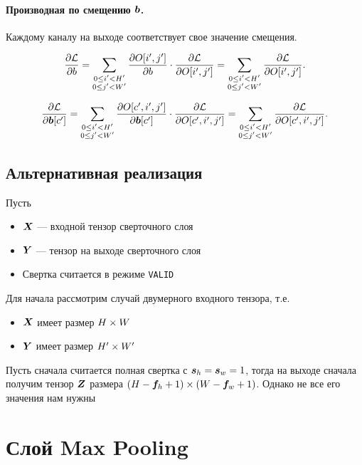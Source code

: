 \documentclass{report}
\numberwithin{theorem}{chapter}
\numberwithin{statement}{chapter}
\numberwithin{lemma}{chapter}
\theoremstyle{definition}
\numberwithin{task}{chapter}
\theoremstyle{remark}
\numberwithin{example}{chapter}
\theoremstyle{definition}
\numberwithin{definition}{chapter}
\theoremstyle{remark}
\theoremstyle{remark}
\numberwithin{lyrics}{section}
\begin{document}
\paragraph{Производная по смещению $\boldsymbol{b}$.}
Каждому каналу на выходе соответствует свое значение смещения.

\begin{equation}
\frac{\partial \mathcal{L} }{\partial b} = \sum\limits_{\substack{0 \le i' < H' \\ 0 \le j' < W'}} \frac{\partial O[i', j'] }{\partial b} \cdot \frac{\partial \mathcal{L} }{\partial O[i', j']} = \sum\limits_{\substack{0 \le i' < H' \\ 0 \le j' < W'}} \frac{\partial \mathcal{L} }{\partial O[i', j']}.
\end{equation}

\begin{equation}
\frac{\partial \mathcal{L} }{\partial \boldsymbol{b}[c']} = \sum\limits_{\substack{0 \le i' < H' \\ 0 \le j' < W'}} \frac{\partial O[c', i', j'] }{\partial \boldsymbol{b}[c']} \cdot \frac{\partial \mathcal{L} }{\partial O[c', i', j']} = \sum\limits_{\substack{0 \le i' < H' \\ 0 \le j' < W'}} \frac{\partial \mathcal{L} }{\partial O[c', i', j']}.
\end{equation}

\subsection{Альтернативная реализация}
Пусть 
\begin{itemize}
	\item $\boldsymbol{X}$ --- входной тензор сверточного слоя
	\item $\boldsymbol{Y}$ --- тензор на выходе сверточного слоя
	\item Свертка считается в режиме \texttt{VALID}
\end{itemize}

Для начала рассмотрим случай двумерного входного тензора, т.е.
\begin{itemize}
	\item $\boldsymbol{X}$ имеет размер $H \times W$
	\item $\boldsymbol{Y}$ имеет размер $H' \times W'$
\end{itemize}

Пусть сначала считается полная свертка с $\boldsymbol{s}_h = \boldsymbol{s}_w = 1$, тогда на выходе сначала получим тензор $\boldsymbol{Z}$ размера $(H - \boldsymbol{f}_h + 1) \times (W - \boldsymbol{f}_w + 1)$. Однако не все его значения нам нужны


\section{Слой Max Pooling}
\end{document}

